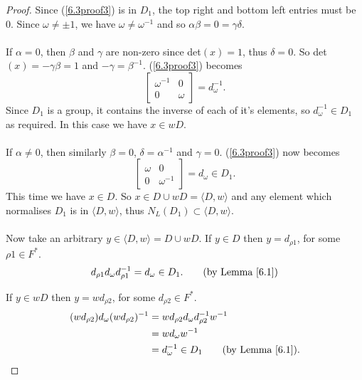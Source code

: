 \begin{proof}
Since (\ref{6.3proof3}) is in $D_1$, the top right and bottom left entries must be 0. Since  $\omega \neq \pm 1$, we have $\omega \neq \omega^{-1}$ and so $\alpha \beta = 0 = \gamma \delta$. \\
\\
 \space If $\alpha = 0$, then $\beta$ and $\gamma$ are non-zero since det$(x) = 1$, thus $\delta = 0$. So det$(x) = \minus \gamma \beta = 1$  and $\minus \gamma = \beta^{-1}$. (\ref{6.3proof3}) becomes $$\begin{bmatrix} \omega^{-1} & 0 \\ 0 & \omega \end{bmatrix} = d^{-1}_\omega.$$Since $D_1$ is a group, it contains the inverse of each of it's elements, so $d^{-1}_\omega \in D_1$ as required. In this case we have $x \in wD$. \\
\\
 \space If $\alpha \neq 0$, then similarly $\beta = 0$, $\delta = \alpha^{-1}$ and $\gamma = 0$. (\ref{6.3proof3}) now becomes $$\begin{bmatrix} \omega & 0 \\ 0 & \omega^{-1} \end{bmatrix} = d_\omega \in D_1.$$This time we have $x \in D$. So $x \in D \cup wD = \langle D , w \rangle$ and any element which normalises $D_1$ is in $\langle D , w \rangle$, thus $N_L(D_1) \subset \langle D , w \rangle$. \\
\\
Now take an arbitrary $y \in \langle D , w \rangle = D \cup wD$. If $y \in D$ then $y = d_{\rho 1}$, for some $\rho 1 \in F^*$.
\begin{align*} d_{\rho 1} d_\omega d^{-1}_{\rho 1} = d_\omega \in D_1. \tag{by Lemma \ref{6.1}}
\end{align*}

If $y \in wD$ then $y = w d_{\rho 2}$, for some $ d_{\rho 2} \in F^*$.
\begin{align*} (w d_{\rho 2}) d_\omega (w d_{\rho 2})^{-1} &= w d_{\rho 2} d_\omega d^{-1}_{\rho 2} w^{-1}
\\ &= w d_\omega w^{-1}
\\ &= d^{-1}_\omega \in D_1 \tag{by Lemma \ref{6.1}}.
\end{align*}


\end{proof}
